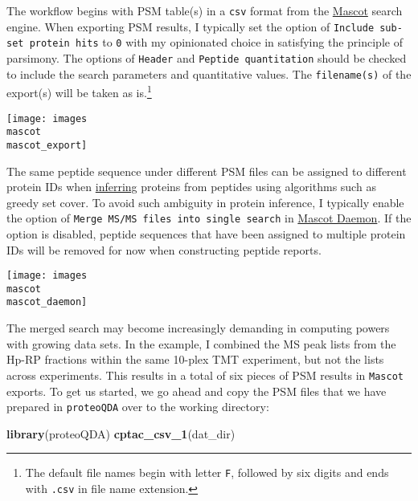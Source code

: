 \documentclass[]{article}
\newenvironment{Shaded}{\begin{snugshade}}{\end{snugshade}}
\newcommand{\KeywordTok}[1]{\textcolor[rgb]{0.13,0.29,0.53}{\textbf{#1}}}
\newcommand{\NormalTok}[1]{#1}
\let\rmarkdownfootnote\footnote%
\def\footnote{\protect\rmarkdownfootnote}
\begin{document}
The workflow begins with PSM table(s) in a \texttt{csv} format from the
\href{https://http://www.matrixscience.com/}{Mascot} search engine. When
exporting PSM results, I typically set the option of
\texttt{Include\ sub-set\ protein\ hits} to \texttt{0} with my
opinionated choice in satisfying the principle of parsimony. The options
of \texttt{Header} and \texttt{Peptide\ quantitation} should be checked
to include the search parameters and quantitative values. The
\texttt{filename(s)} of the export(s) will be taken as is.\footnote{The
  default file names begin with letter \texttt{F}, followed by six
  digits and ends with \texttt{.csv} in file name extension.}

\begin{center}\texttt{[image: images\\mascot\\mascot\_export]} \end{center}

The same peptide sequence under different PSM files can be assigned to
different protein IDs when
\href{https://www.ncbi.nlm.nih.gov/m/pubmed/21447708/}{inferring}
proteins from peptides using algorithms such as greedy set cover. To
avoid such ambiguity in protein inference, I typically enable the option
of \texttt{Merge\ MS/MS\ files\ into\ single\ search} in
\href{http://www.matrixscience.com/daemon.html}{Mascot Daemon}. If the
option is disabled, peptide sequences that have been assigned to
multiple protein IDs will be removed for now when constructing peptide
reports.

\begin{center}\texttt{[image: images\\mascot\\mascot\_daemon]} \end{center}

The merged search may become increasingly demanding in computing powers
with growing data sets. In the example, I combined the MS peak lists
from the Hp-RP fractions within the same 10-plex TMT experiment, but not
the lists across experiments. This results in a total of six pieces of
PSM results in \texttt{Mascot} exports. To get us started, we go ahead
and copy the PSM files that we have prepared in \texttt{proteoQDA} over
to the working directory:

\begin{Shaded}
\begin{Highlighting}[]
\KeywordTok{library}\NormalTok{(proteoQDA)}
\KeywordTok{cptac_csv_1}\NormalTok{(dat_dir)}
\end{Highlighting}
\end{Shaded}
\end{document}
